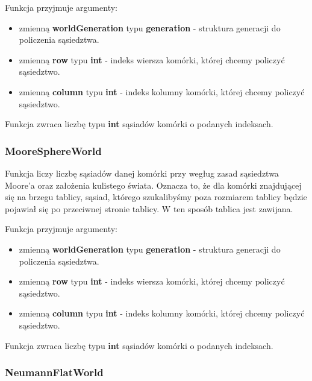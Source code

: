 \documentclass[a4paper]{article}
\begin{document}
Funkcja przyjmuje argumenty:

\begin{itemize}
        \item zmienn\k{a} \textbf{worldGeneration} typu \textbf{generation} - struktura generacji do policzenia s\k{a}siedztwa.
	\item zmienn\k{a} \textbf{row} typu \textbf{int} - indeks wiersza kom\'orki, kt\'orej chcemy policzy\'c s\k{a}siedztwo.
	\item zmienn\k{a} \textbf{column} typu \textbf{int} - indeks kolumny kom\'orki, kt\'orej chcemy policzy\'c s\k{a}siedztwo.
\end{itemize}

\quad Funkcja zwraca liczb\k{e} typu \textbf{int} s\k{a}siad\'ow kom\'orki o podanych indeksach.

\subsubsection{MooreSphereWorld}

\quad Funkcja liczy liczb\k{e} s\k{a}siad\'ow danej kom\'orki przy weg\l{}ug zasad s\k{a}siedztwa Moore'a oraz za\l{}o\.zenia kulistego \'swiata.
Oznacza to, \.ze dla kom\'orki znajduj\k{a}cej si\k{e} na brzegu tablicy, s\k{a}siad, kt\'orego szukaliby\'smy poza rozmiarem tablicy b\k{e}dzie pojawia\l{} si\k{e} po przeciwnej stronie tablicy. 
W ten spos\'ob tablica jest zawijana.

Funkcja przyjmuje argumenty:

\begin{itemize}
        \item zmienn\k{a} \textbf{worldGeneration} typu \textbf{generation} - struktura generacji do policzenia s\k{a}siedztwa.
        \item zmienn\k{a} \textbf{row} typu \textbf{int} - indeks wiersza kom\'orki, kt\'orej chcemy policzy\'c s\k{a}siedztwo.
        \item zmienn\k{a} \textbf{column} typu \textbf{int} - indeks kolumny kom\'orki, kt\'orej chcemy policzy\'c s\k{a}siedztwo.
\end{itemize}

\quad Funkcja zwraca liczb\k{e} typu \textbf{int} s\k{a}siad\'ow kom\'orki o podanych indeksach.


\subsubsection{NeumannFlatWorld}
\end{document}

